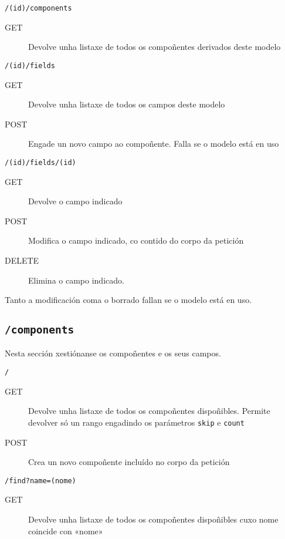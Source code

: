 \texttt{/(id)/components}

\begin{description}
    \item[GET] Devolve unha listaxe de todos os compoñentes derivados deste modelo
\end{description}

\texttt{/(id)/fields}

\begin{description}
    \item[GET] Devolve unha listaxe de todos os campos deste modelo
    \item[POST] Engade un novo campo ao compoñente. Falla se o modelo está en uso
\end{description}

\texttt{/(id)/fields/(id)}

\begin{description}
    \item[GET] Devolve o campo indicado
    \item[POST] Modifica o campo indicado, co contido do corpo da petición
    \item[DELETE] Elimina o campo indicado.
\end{description}

Tanto a modificación coma o borrado fallan se o modelo está en uso.

\subsection{\texttt{/components}}

Nesta sección xestiónanse os compoñentes e os seus campos.

\texttt{/}

\begin{description}
    \item[GET] Devolve unha listaxe de todos os compoñentes dispoñibles. Permite devolver só un rango engadindo os parámetros \texttt{skip} e \texttt{count}
    \item[POST] Crea un novo compoñente incluído no corpo da petición
\end{description}

\texttt{/find?name=(nome)}

\begin{description}
    \item[GET] Devolve unha listaxe de todos os compoñentes dispoñibles cuxo nome coincide con «nome»
\end{description}

